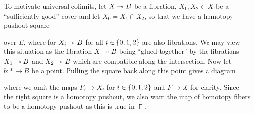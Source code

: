 To motivate universal colimits, let $X\xtwoheadrightarrow{} B$ be a fibration, $X_1,X_2\subset X$ be a ``sufficiently good'' cover and let $X_0=X_1\cap X_2$, so that we have a homotopy pushout square
\begin{center}
\end{center}
over $B$, where for $X_i\xtwoheadrightarrow{} B$ for all $i\in\left\lbrace0,1,2\right\rbrace$ are also fibrations.
We may view this situation as the fibration $X\xtwoheadrightarrow{} B$ being ``glued together'' by the fibrations $X_1\xtwoheadrightarrow{} B$ and $X_2\xtwoheadrightarrow{} B$ which are compatible along the intersection.
Now let $b\colon*\to B$ be a point. 
Pulling the square back along this point gives a diagram
\begin{center}
\end{center}
where we omit the maps $F_i\to X_i$ for $i\in\left\lbrace0,1,2\right\rbrace$ and $F\to X$ for clarity.
Since the right square is a homotopy pushout, we also want the map of homotopy fibers to be a homotopy pushout as this is true in $\Top$.

